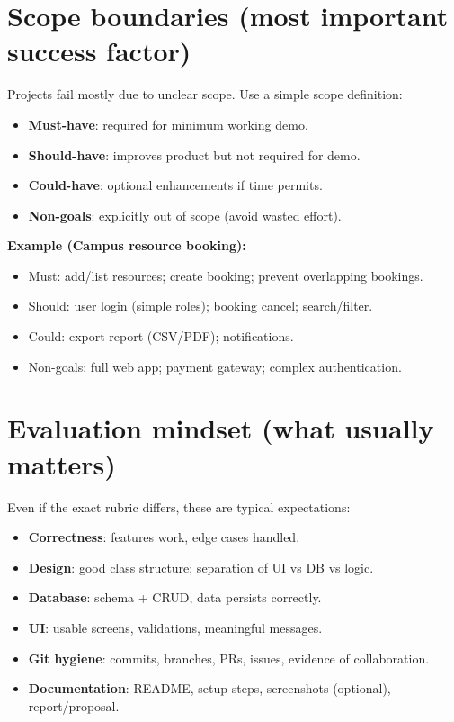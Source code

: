 \documentclass[11pt]{article}
\begin{document}
\section{Scope boundaries (most important success factor)}
Projects fail mostly due to unclear scope.
Use a simple scope definition:
\begin{itemize}
  \item \textbf{Must-have}: required for minimum working demo.
  \item \textbf{Should-have}: improves product but not required for demo.
  \item \textbf{Could-have}: optional enhancements if time permits.
  \item \textbf{Non-goals}: explicitly out of scope (avoid wasted effort).
\end{itemize}

\textbf{Example (Campus resource booking):}
\begin{itemize}
  \item Must: add/list resources; create booking; prevent overlapping bookings.
  \item Should: user login (simple roles); booking cancel; search/filter.
  \item Could: export report (CSV/PDF); notifications.
  \item Non-goals: full web app; payment gateway; complex authentication.
\end{itemize}

\section{Evaluation mindset (what usually matters)}
Even if the exact rubric differs, these are typical expectations:
\begin{itemize}
  \item \textbf{Correctness}: features work, edge cases handled.
  \item \textbf{Design}: good class structure; separation of UI vs DB vs logic.
  \item \textbf{Database}: schema + CRUD, data persists correctly.
  \item \textbf{UI}: usable screens, validations, meaningful messages.
  \item \textbf{Git hygiene}: commits, branches, PRs, issues, evidence of collaboration.
  \item \textbf{Documentation}: README, setup steps, screenshots (optional), report/proposal.
\end{itemize}
\end{document}
